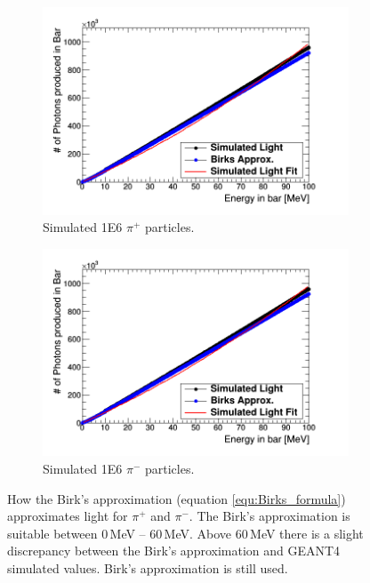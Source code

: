\begin{figure}[htbp]
\centering
\begin{subfigure}{.5\textwidth}
  \centering
  \includegraphics[width=\linewidth]{Appendix5/Figs/light_of_pIPlus0-100mev.png}
  \captionsetup{width=.9\linewidth}
  \caption{Simulated 1E6 $\pi^+$ particles.}
  \label{subfig:append5_light_of_pIPlus0-100mev}
\end{subfigure}%
\begin{subfigure}{.5\textwidth}
  \centering
  \includegraphics[width=\linewidth]{Appendix5/Figs/light_of_pIMinus0-100mev.png}
  \captionsetup{width=.9\linewidth}
  \caption{Simulated 1E6 $\pi^-$ particles.}
  \label{subfig:append5_light_of_pIMinus0-100mev}
\end{subfigure}
\caption{How the Birk's approximation (equation \ref{equ:Birks_formula}) approximates light for $\pi^+$ and $\pi^-$. The Birk's approximation is suitable between 0\,MeV -- 60\,MeV. Above 60\,MeV there is a slight discrepancy between the Birk's approximation and GEANT4 simulated values. Birk's approximation is still used.}
\label{fig:append5_light_of_pIPlus_pIMinus0-100mev}
\end{figure}

